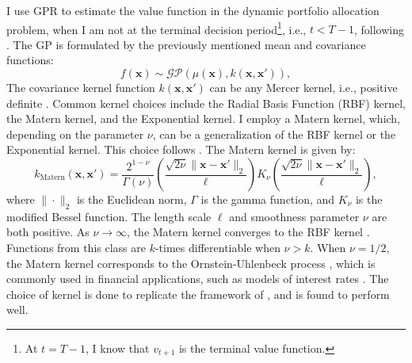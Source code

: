 \documentclass[11pt]{article}
\begin{document}
I use \ac{GPR} to estimate the value function in the dynamic portfolio allocation problem,
when I am not at the terminal decision period\footnote{At $t=T-1$, I know that $v_{t+1}$ is the terminal value function.}, i.e., \( t < T-1 \), following \autocite{Scheidegger2023}.
The \ac{GP} is formulated by the previously mentioned mean and covariance functions:
\begin{equation} \label{eq: GP-definition}
  f(\mathbf{x}) \sim \mathcal{GP}(\mu(\mathbf{x}), k(\mathbf{x}, \mathbf{x}')),
\end{equation}
The covariance kernel function \( k(\mathbf{x}, \mathbf{x}') \) can be any Mercer kernel, i.e., positive definite \autocite{MurphyBook2023}.
Common kernel choices include the Radial Basis Function (RBF) kernel, the Matern kernel, and the Exponential kernel.
I employ a Matern kernel, which, depending on the parameter \( \nu \), 
can be a generalization of the RBF kernel or the Exponential kernel. This choice follows \autocite{Scheidegger2023}.
The Matern kernel is given by:
\begin{equation} \label{eq: Matern-kernel}
  k_{\text{Matern}}(\mathbf{x} , \mathbf{x}') = \frac{2^{1-\nu}}{\Gamma(\nu)}  \left( \frac{\sqrt{2 \nu} \| \mathbf{x} - \mathbf{x}' \|_{2}}{\ell} \right) K_{\nu} \left( \frac{\sqrt{2 \nu} \| \mathbf{x} - \mathbf{x}' \|_{2}}{\ell} \right),
\end{equation}
where \( \| \cdot \|_{2} \) is the Euclidean norm, \( \Gamma \) is the gamma function, and \( K_{\nu} \) is the modified Bessel function.
The length scale \( \ell \) and smoothness parameter \( \nu \) are both positive. As \( \nu \to \infty \), the Matern kernel converges to the RBF kernel \autocite{Gonzalvez2019}.
Functions from this class are \( k \)-times differentiable when \( \nu > k \).
When \( \nu = 1/2 \), the Matern kernel corresponds to the Ornstein-Uhlenbeck process \autocite{MurphyBook2023},
which is commonly used in financial applications, such as models of interest rates \autocite{Glasserman2004MC}.
The choice of kernel is done to replicate the framework of \autocite{Scheidegger2023}, and is found to perform well.
\end{document}
